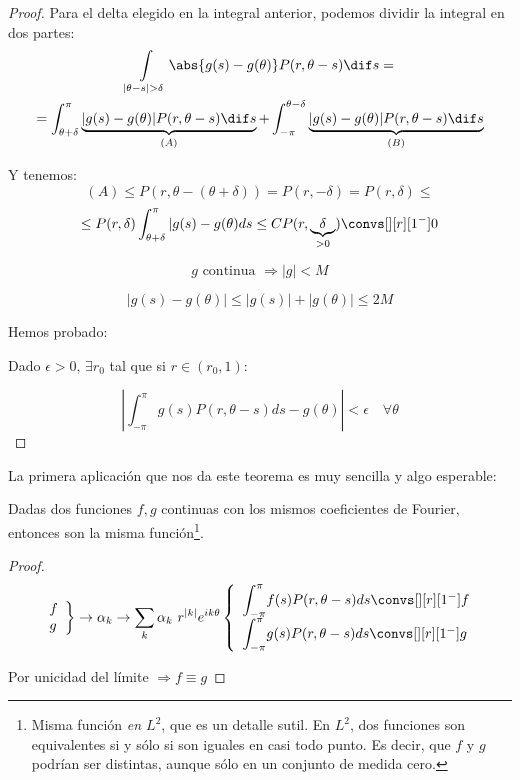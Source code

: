 \begin{proof}

				\noindent Para el delta elegido en la integral anterior, podemos dividir la integral en dos partes:
				\begin{multline*}
				\int\limits_{|\theta - s | > \delta} \abs{g(s) - g(\theta)} P(r, \theta-s) \dif s = \\
				= \int_{\theta+\delta}^\pi \underbrace{|g(s) - g(\theta)| P(r, \theta-s) \dif s}_{(A)} +  \int_{-\pi}^{\theta-\delta} \underbrace{|g(s) - g(\theta)| P(r, \theta-s) \dif s}_{(B)}
				\end{multline*}

				Y tenemos:
				\[ (A) \leq P(r, \theta-(\theta+\delta)) = P(r, -\delta) = P(r, \delta) \leq  \]
				\[\leq P(r, \delta) \int^{\pi}_{\theta+\delta} |g(s) - g(\theta) ds \leq C P(r, \underbrace{\delta}_{> 0}) \convs[][r][1^-] 0  \]

				\[g \text{ continua } \Rightarrow |g| < M \]

				\[ |g(s)  - g(\theta)| \leq |g(s)| + | g(\theta) | \leq 2M \]


				Hemos probado:

				Dado $\epsilon > 0$, $\exists r_0$ tal que si $r \in (r_0,1)$:

				\[ \left| \int_{-\pi}^\pi g(s) P(r, \theta-s) ds - g(\theta)  \right| < \epsilon \quad \forall \theta \]

			\end{proof}

		\noindent La primera aplicación que nos da este teorema es muy sencilla y algo esperable:
		\begin{prop}
		Dadas dos funciones $f,g$ continuas con los mismos coeficientes de Fourier, entonces son la misma función\footnote{Misma función \textit{en $L^2$}, que es un detalle sutil. En $L^2$, dos funciones son equivalentes si y sólo si son iguales en casi todo punto. Es decir, que $f$ y $g$ podrían ser distintas, aunque sólo en un conjunto de medida cero.}.
		\end{prop}
		\begin{proof}
			\[
				\left. \begin{array}{l}
				f \\
				g
				\end{array} \right\} \rightarrow \alpha_k \rightarrow \sum_k \alpha_k\ r^{|k|} e^{ik\theta} \left\{ \begin{array}{l}
					{\displaystyle \int^{\pi}_{-\pi}} f(s) P(r, \theta - s)ds \convs[][r][1^-] f \\
					{\displaystyle \int^{\pi}_{-\pi}} g(s) P(r, \theta - s)ds \convs[][r][1^-] g
				\end{array} \right.
			\]

			Por unicidad del límite $\Rightarrow f \equiv g$
		\end{proof}

